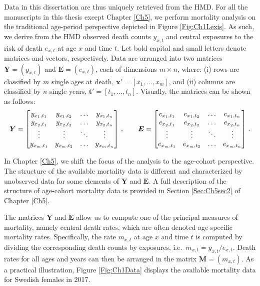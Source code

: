 \documentclass[Thesis]{subfiles}
\begin{document}
Data in this dissertation are thus uniquely retrieved from the HMD. For all the manuscripts in this thesis except Chapter \ref{Ch5}, we perform mortality analysis on the traditional age-period perspective depicted in Figure \ref{Fig:Ch1Lexis}. As such, we derive from the HMD observed death counts $y_{x,t}$ and central exposures to the risk of death $e_{x,t}$ at age $x$ and time $t$. Let bold capital and small letters denote matrices and vectors, respectively.  Data are arranged into two matrices $\bm{Y} = (y_{x,t})$ and $\bm{E} = (e_{x,t})$, each of dimensions $m \times n$, where: (i) rows are classified by $m$ single ages at death, $\bm{x}'=\left[x_1,\dots,x_m\right]$, and (ii) columns are classified by $n$ single years, $\bm{t}'=\left[t_1,\dots,t_n\right]$. Visually, the matrices can be shown as follows:
%
\begin{equation}\label{Eq:Ch1YEmat}
\bm{Y} = \begin{bmatrix}
y_{x_1,t_1} & y_{x_1,t_2} & \dots & y_{x_1,t_n} \\
y_{x_2,t_1} & y_{x_2,t_2} & \dots & y_{x_2,t_n} \\
\vdots & \vdots & \ddots & \vdots \\
y_{x_m,t_1} & y_{x_m,t_2} & \dots & y_{x_m,t_n}
\end{bmatrix} \, , \qquad \bm{E} = \begin{bmatrix}
e_{x_1,t_1} & e_{x_1,t_2} & \dots & e_{x_1,t_n} \\
e_{x_2,t_1} & e_{x_2,t_2} & \dots & e_{x_2,t_n} \\
\vdots & \vdots & \ddots & \vdots \\
e_{x_m,t_1} & e_{x_m,t_2} & \dots & e_{x_m,t_n}
\end{bmatrix} \, . \notag
\end{equation}
%

In Chapter \ref{Ch5}, we shift the focus of the analysis to the age-cohort perspective. The structure of the available mortality data is different and characterized by unobserved data for some elements of $\bm{Y}$ and $\bm{E}$. A full description of the structure of age-cohort mortality data is provided in Section \ref{Sec:Ch5sec2} of Chapter \ref{Ch5}.

The matrices $\bm{Y}$ and $\bm{E}$ allow us to compute one of the principal measures of mortality, namely central death rates, which are often denoted age-specific mortality rates. Specifically, the rate $m_{x,t}$ at age $x$ and time $t$ is computed by dividing the corresponding death counts by exposures, i.e.~$m_{x,t} = y_{x,t} / e_{x,t}$. Death rates for all ages and years can then be arranged in the matrix $\bm{M} = (m_{x,t})$. As a practical illustration, Figure \ref{Fig:Ch1Data} displays the available mortality data for Swedish females in 2017. 
\end{document}
